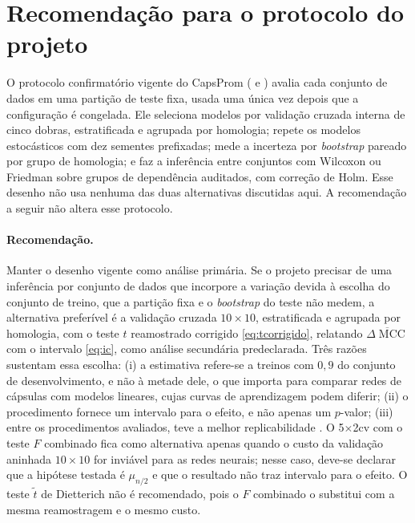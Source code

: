 \documentclass[11pt,a4paper]{article}
\newcommand{\MCC}{\operatorname{MCC}}
\begin{document}
\section{Recomendação para o protocolo do projeto}\label{sec:recomendacao}

O protocolo confirmatório vigente do CapsProm
( e
) avalia cada conjunto de dados
em uma partição de teste fixa, usada uma única vez depois que a configuração é
congelada. Ele seleciona modelos por validação cruzada interna de cinco dobras,
estratificada e agrupada por homologia; repete os modelos estocásticos com dez
sementes prefixadas; mede a incerteza por \emph{bootstrap} pareado por grupo de
homologia; e faz a inferência entre conjuntos com Wilcoxon ou Friedman sobre
grupos de dependência auditados, com correção de Holm. Esse desenho não usa
nenhuma das duas alternativas discutidas aqui. A recomendação a seguir não
altera esse protocolo.

\paragraph{Recomendação.}
Manter o desenho vigente como análise primária. Se o projeto precisar de uma
inferência por conjunto de dados que incorpore a variação devida à escolha do
conjunto de treino, que a partição fixa e o \emph{bootstrap} do teste não
medem, a alternativa preferível é a validação cruzada $10\times10$,
estratificada e agrupada por homologia, com o teste $t$ reamostrado corrigido
\eqref{eq:tcorrigido}, relatando $\overline{\Delta\MCC}$ com o intervalo
\eqref{eq:ic}, como análise secundária predeclarada. Três razões sustentam essa
escolha: (i) a estimativa refere-se a treinos com $0{,}9$ do conjunto de
desenvolvimento, e não à metade dele, o que importa para comparar redes de
cápsulas com modelos lineares, cujas curvas de aprendizagem podem diferir; (ii)
o procedimento fornece um intervalo para o efeito, e não apenas um $p$-valor;
(iii) entre os procedimentos avaliados, teve a melhor replicabilidade
\citep{bouckaert2004replicability}. O 5$\times$2cv com o teste $F$ combinado
fica como alternativa apenas quando o custo da validação aninhada $10\times10$
for inviável para as redes neurais; nesse caso, deve-se declarar que a
hipótese testada é $\mu_{n/2}$ e que o resultado não traz intervalo para o
efeito. O teste $\tilde t$ de Dietterich não é recomendado, pois o $F$
combinado o substitui com a mesma reamostragem e o mesmo custo.
\end{document}
